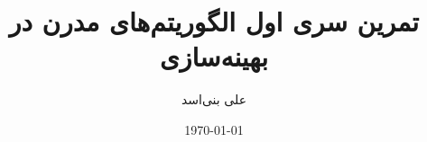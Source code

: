 \documentclass[12pt,onecolumn,a4paper]{article}
\begin{document}
	\title{تمرین سری اول الگوریتم‌های مدرن در بهینه‌سازی} 
	\author{علی بنی‌اسد}
	\date{\today}
	\maketitle
	
	
	
	
	
	
	
	
	
	
	
	
\end{document}
